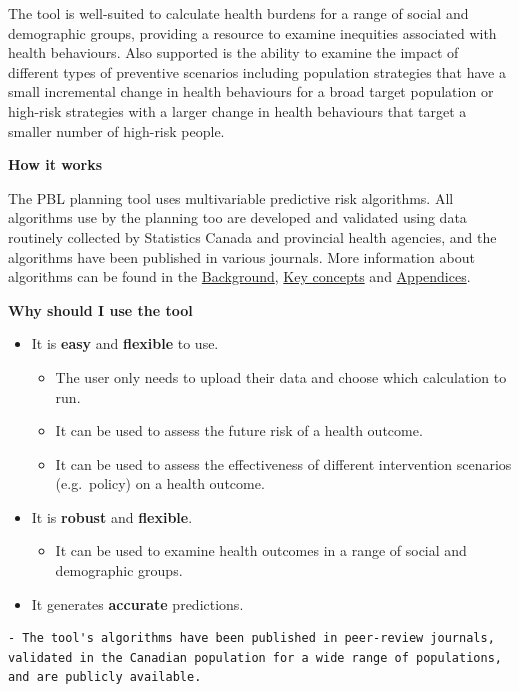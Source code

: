 \documentclass[]{book}
\providecommand{\tightlist}{%
  \setlength{\itemsep}{0pt}\setlength{\parskip}{0pt}}
\begin{document}
The tool is well-suited to calculate health burdens for a range of social and demographic groups, providing a resource to examine inequities associated with health behaviours.\citep{manuel2018} Also supported is the ability to examine the impact of different types of preventive scenarios including population strategies that have a small incremental change in health behaviours for a broad target population or high-risk strategies with a larger change in health behaviours that target a smaller number of high-risk people.\citep{PoRTover}

\textbf{How it works}

The PBL planning tool uses multivariable predictive risk algorithms. All algorithms use by the planning too are developed and validated using data routinely collected by Statistics Canada and provincial health agencies, and the algorithms have been published in various journals. More information about algorithms can be found in the \protect\hyperlink{background}{Background}, \protect\hyperlink{keyconcepts}{Key concepts} and \protect\hyperlink{mport}{Appendices}.

\textbf{Why should I use the tool}

\begin{itemize}
\item
  It is \textbf{easy} and \textbf{flexible} to use.

  \begin{itemize}
  \tightlist
  \item
    The user only needs to upload their data and choose which calculation to run.
  \item
    It can be used to assess the future risk of a health outcome.
  \item
    It can be used to assess the effectiveness of different intervention scenarios (e.g.~policy) on a health outcome.
  \end{itemize}
\item
  It is \textbf{robust} and \textbf{flexible}.

  \begin{itemize}
  \tightlist
  \item
    It can be used to examine health outcomes in a range of social and demographic groups.
  \end{itemize}
\item
  It generates \textbf{accurate} predictions.
\end{itemize}

\begin{verbatim}
- The tool's algorithms have been published in peer-review journals, validated in the Canadian population for a wide range of populations, and are publicly available.
\end{verbatim}
\end{document}
